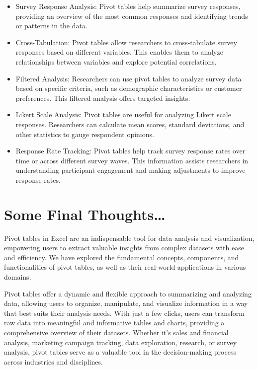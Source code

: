 \documentclass[
]{book}
\begin{document}
\begin{itemize}
\item
  Survey Response Analysis: Pivot tables help summarize survey responses, providing an overview of the most common responses and identifying trends or patterns in the data.
\item
  Cross-Tabulation: Pivot tables allow researchers to cross-tabulate survey responses based on different variables. This enables them to analyze relationships between variables and explore potential correlations.
\item
  Filtered Analysis: Researchers can use pivot tables to analyze survey data based on specific criteria, such as demographic characteristics or customer preferences. This filtered analysis offers targeted insights.
\item
  Likert Scale Analysis: Pivot tables are useful for analyzing Likert scale responses. Researchers can calculate mean scores, standard deviations, and other statistics to gauge respondent opinions.
\item
  Response Rate Tracking: Pivot tables help track survey response rates over time or across different survey waves. This information assists researchers in understanding participant engagement and making adjustments to improve response rates.
\end{itemize}

\hypertarget{some-final-thoughts}{%
\chapter{Some Final Thoughts\ldots{}}\label{some-final-thoughts}}

Pivot tables in Excel are an indispensable tool for data analysis and visualization, empowering users to extract valuable insights from complex datasets with ease and efficiency. We have explored the fundamental concepts, components, and functionalities of pivot tables, as well as their real-world applications in various domains.

Pivot tables offer a dynamic and flexible approach to summarizing and analyzing data, allowing users to organize, manipulate, and visualize information in a way that best suits their analysis needs. With just a few clicks, users can transform raw data into meaningful and informative tables and charts, providing a comprehensive overview of their datasets. Whether it's sales and financial analysis, marketing campaign tracking, data exploration, research, or survey analysis, pivot tables serve as a valuable tool in the decision-making process across industries and disciplines.
\end{document}
